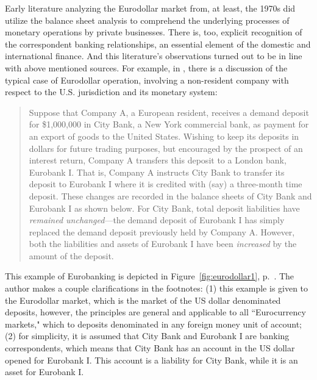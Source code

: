 Early literature analyzing the Eurodollar market from, at least, the 1970s did utilize the balance sheet analysis to comprehend the underlying processes of monetary operations by private businesses. There is, too, explicit recognition of the correspondent banking relationships, an essential element of the domestic and international finance. And this literature's observations turned out to be in line with above mentioned sources. For example, in \cite[pp.~1-16]{hewson1975}, there is a discussion of the typical case of Eurodollar operation, involving a non-resident company with respect to the U.S. jurisdiction and its monetary system:

\begin{quote}
Suppose that Company A, a European resident, receives a demand deposit for \$1,000,000 in City Bank, a New York commercial bank, as payment for an export of goods to the United States. Wishing to keep its deposits in dollars for future trading purposes, but encouraged by the prospect of an interest return, Company A transfers this deposit to a London bank, Eurobank I. That is, Company A instructs City Bank to transfer its deposit to Eurobank I where it is credited with (say) a three-month time deposit. These changes are recorded in the balance sheets of City Bank and Eurobank I as shown below. For City Bank, total deposit liabilities have \textit{remained unchanged}---the demand deposit of Eurobank I has simply replaced the demand deposit previously held by Company A. However, both the liabilities and assets of Eurobank I have been \textit{increased} by the amount of the deposit. \citep[p.~2, emphasis added]{hewson1975}
\end{quote}

This example of Eurobanking is depicted in \mbox{Figure \ref{fig:eurodollar1}}, \mbox{p. \pageref{fig:eurodollar1}}.
The author makes a couple clarifications in the footnotes: (1) this example is given to the Eurodollar market, which is the market of the US dollar denominated deposits, however, the principles are general and applicable to all ``Eurocurrency markets," which to deposits denominated in any foreign money unit of account; (2) for simplicity, it is assumed that City Bank and Eurobank I are banking correspondents, which means that City Bank has an account in the US dollar opened for Eurobank I. This account is a liability for City Bank, while it is an asset for Eurobank I.

